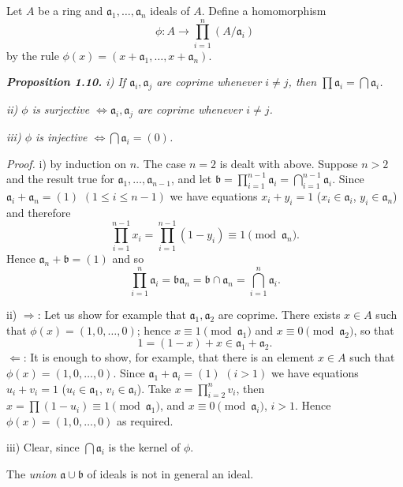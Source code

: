 Let $A$ be a ring and $\mathfrak a_1,\ldots,\mathfrak a_n$ ideals of $A$.  Define a homomorphism
\[
\phi:A\longrightarrow\prod_{i=1}^n(A/\mathfrak a_i)
\]
by the rule $\phi(x)=(x+\mathfrak a_1,\ldots,x+\mathfrak a_n)$.

\medskip
\noindent\textit{\textbf{Proposition 1.10.} i) If $\mathfrak a_i,\mathfrak a_j$ are coprime whenever $i\ne j$, then $\prod\mathfrak a_i=\bigcap\mathfrak a_i$.}

\noindent\textit{ii) $\phi$ is surjective $\Longleftrightarrow\mathfrak a_i,\mathfrak a_j$ are coprime whenever $i\ne j$.}

\noindent\textit{iii) $\phi$ is injective $\Longleftrightarrow\bigcap\mathfrak a_i=(0)$.}

\noindent\emph{Proof.}  i) by induction on $n$.  The case $n=2$ is dealt with above.  Suppose
$n>2$ and the result true for $\mathfrak a_1,\ldots,\mathfrak a_{n-1}$, and let $\mathfrak b=\prod_{i=1}^{n-1}\mathfrak a_i=\bigcap_{i=1}^{n-1}\mathfrak a_i$.  Since
$\mathfrak a_i+\mathfrak a_n=(1)$ $(1\leq i\leq n-1)$ we have equations $x_i+y_i=1$ ($x_i\in\mathfrak a_i$, $y_i\in\mathfrak a_n$)
and therefore
\[
\prod_{i=1}^{n-1}x_i=\prod_{i=1}^{n-1}(1-y_i)\equiv1\pmod{\mathfrak a_n}.
\]
Hence $\mathfrak a_n+\mathfrak b=(1)$ and so
\[
\prod_{i=1}^n\mathfrak a_i=\mathfrak b\mathfrak a_n=\mathfrak b\cap\mathfrak a_n=\bigcap_{i=1}^n\mathfrak a_i.
\]

ii) $\Rightarrow$: Let us show for example that $\mathfrak a_1,\mathfrak a_2$ are coprime.  There exists $x\in A$
such that $\phi(x)=(1,0,\ldots,0)$; hence $x\equiv1\pmod{\mathfrak a_1}$ and $x\equiv0\pmod{\mathfrak a_2}$, so
that
\[
1=(1-x)+x\in\mathfrak a_1+\mathfrak a_2.
\]
$\Leftarrow$: It is enough to show, for example, that there is an element $x\in A$ such that
$\phi(x)=(1,0,\ldots,0)$.  Since $\mathfrak a_1+\mathfrak a_i=(1)$ $(i>1)$ we have equations $u_i+v_i=1$
($u_i\in\mathfrak a_1$, $v_i\in\mathfrak a_i$).  Take $x=\prod_{i=2}^n v_i$, then $x=\prod(1-u_i)\equiv1\pmod{\mathfrak a_1}$, and
$x\equiv0\pmod{\mathfrak a_i}$, $i>1$.  Hence $\phi(x)=(1,0,\ldots,0)$ as required.

iii) Clear, since $\bigcap\mathfrak a_i$ is the kernel of $\phi$.\proofbox

The \emph{union} $\mathfrak a\cup\mathfrak b$ of ideals is not in general an ideal.

